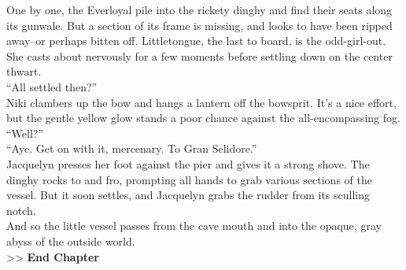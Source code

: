 One by one, the Everloyal pile into the rickety dinghy and find their seats along its gunwale. But a section of its frame is missing, and looks to have been ripped away--or perhaps bitten off. Littletongue, the last to board, is the odd-girl-out. She casts about nervously for a few moments before settling down on the center thwart.\\

“All settled then?”\\

Niki clambers up the bow and hangs a lantern off the bowsprit. It’s a nice effort, but the gentle yellow glow stands a poor chance against the all-encompassing fog.\\

“Well?”\\

“Aye. Get on with it, mercenary. To Gran Selidore.”\\

Jacquelyn presses her foot against the pier and gives it a strong shove. The dinghy rocks to and fro, prompting all hands to grab various sections of the vessel. But it soon settles, and Jacquelyn grabs the rudder from its sculling notch.\\

And so the little vessel passes from the cave mouth and into the opaque, gray abyss of the outside world.\\

>> \textbf{End Chapter}
